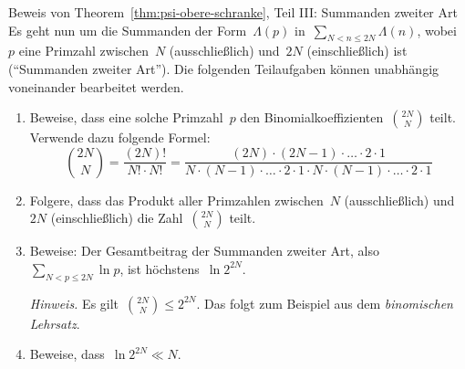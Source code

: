\documentclass[twoside]{../zirkelblatt1415}
\theoremstyle{definition}
\theoremstyle{plain}
\theoremstyle{remark}
\begin{document}
\begin{aufgabe}{Beweis von Theorem~\ref{thm:psi-obere-schranke}, Teil III:
Summanden zweiter Art}
Es geht nun um die Summanden der Form~$\Lambda(p)$ in~$\sum_{N < n \leq 2N}
\Lambda(n)$, wobei~$p$ eine Primzahl zwischen~$N$ (ausschließlich) und~$2N$
(einschließlich) ist ("`Summanden zweiter Art"'). Die folgenden Teilaufgaben
können unabhängig voneinander bearbeitet werden.
\begin{enumerate}
\item Beweise, dass eine solche Primzahl~$p$ den
Binomialkoeffizienten~$\binom{2N}{N}$ teilt. Verwende dazu folgende Formel:
\[ \binom{2N}{N} = \frac{(2N)!}{N! \cdot N!} =
  \frac{(2N) \cdot (2N-1) \cdot \ldots \cdot 2 \cdot 1}{
  N \cdot (N-1) \cdot \ldots \cdot 2 \cdot 1 \cdot
  N \cdot (N-1) \cdot \ldots \cdot 2 \cdot 1} \]
\item Folgere, dass das Produkt aller Primzahlen zwischen~$N$
(ausschließlich) und~$2N$ (einschließlich) die Zahl~$\binom{2N}{N}$ teilt.
\item Beweise: Der Gesamtbeitrag der Summanden zweiter Art, also~$\sum_{N < p
\leq 2N} \ln p$, ist höchstens~$\ln 2^{2N}$.

\emph{Hinweis.} Es gilt~$\binom{2N}{N} \leq 2^{2N}$. Das folgt zum Beispiel aus
dem \emph{binomischen Lehrsatz}.
\item Beweise, dass~$\ln 2^{2N} \ll N$.
\end{enumerate}\fixlistspacing
\end{aufgabe}
\end{document}

